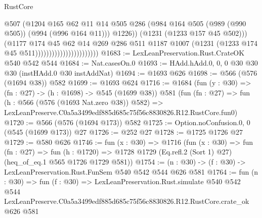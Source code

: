 \begin{lexlean}{RustCore}
\begin{coremodule}
                                                @507
                                                (@1204
                                                  @165
                                                  @62
                                                  @11
                                                  @14
                                                  @505
                                                  @286
                                                  (@984
                                                    @164
                                                    @505
                                                    (@989 (@990 @505))
                                                    (@994 (@996 @164 @11)))
                                                  @1226))
                                              (@1231 (@1233 @157 @45 @502)))
                                            (@1177
                                              @174
                                              @45
                                              @62
                                              @14
                                              @269
                                              @286
                                              @511
                                              @1187
                                              @1007
                                              (@1231 (@1233 @174 @45 @511)))))))))))))))))))))))
@1683 := LexLeanPreservation.Rust.CrateOK @540 @542 @544
@1684 := Nat.casesOn.{0}
@1693 := HAdd.hAdd.{0, 0, 0} @30 @30 @30 (instHAdd.{0} @30 instAddNat)
@1694 := @1693 @626
@1698 := @566 (@576 (@1694 @38)) @582
@1699 := @1693 @624
@1716 := @1684
    (fun (y : @30) => (fn : @27) -> (h : @1698) -> @545 (@1699 @38))
    @581
    (fun (fn : @27) =>
    fun (h : @566 (@576 (@1693 Nat.zero @38)) @582) =>
    LexLeanPreserve.C0a5a3499edf885d685c75f56c8830826.R12.RustCore.fun0)
@1720 := @566 (@576 (@1694 @173)) @582
@1725 := Option.noConfusion.{0, 0} (@545 (@1699 @173)) @27
@1726 := @252 @27
@1728 := @1725 @1726 @27
@1729 := @580 @626
@1746 := fun (x : @30) =>
  @1716
    (fun (x : @30) =>
    fun (fn : @27) =>
    fun (h : @1720) => @1728 @1729 (Eq.refl.{2} (Sort 1) @27) (heq_of_eq.{1} @565 @1726 @1729 @581))
@1754 := (n : @30) -> (f : @30) -> LexLeanPreservation.Rust.FunSem @540 @542 @544 @626 @581
@1764 := fun (n : @30) =>
  fun (f : @30) =>
  LexLeanPreservation.Rust.simulate
    @540
    @542
    @544
    LexLeanPreserve.C0a5a3499edf885d685c75f56c8830826.R12.RustCore.crate_ok
    @626
    @581
\end{coremodule}
\end{lexlean}
